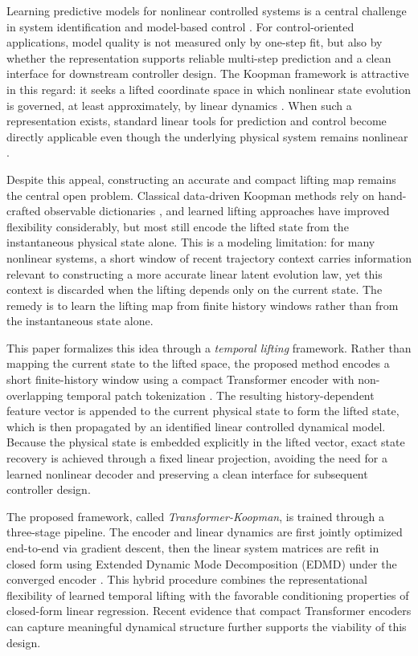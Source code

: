 \documentclass[journal]{IEEEtran}
\begin{document}
Learning predictive models for nonlinear controlled systems is a central challenge in system identification and model-based control \cite{ljung1999system, vanoverschee1994n4sid, nelles2020nonlinear}. For control-oriented applications, model quality is not measured only by one-step fit, but also by whether the representation supports reliable multi-step prediction and a clean interface for downstream controller design. The Koopman framework is attractive in this regard: it seeks a lifted coordinate space in which nonlinear state evolution is governed, at least approximately, by linear dynamics \cite{koopman1931hamiltonian, brunton2022modern}. When such a representation exists, standard linear tools for prediction and control become directly applicable even though the underlying physical system remains nonlinear \cite{otto2021koopman, korda2018linear}.

Despite this appeal, constructing an accurate and compact lifting map remains the central open problem. Classical data-driven Koopman methods rely on hand-crafted observable dictionaries \cite{williams2015data, klus2018data}, and learned lifting approaches \cite{lusch2018deep, takeishi2017koopman} have improved flexibility considerably, but most still encode the lifted state from the instantaneous physical state alone. This is a modeling limitation: for many nonlinear systems, a short window of recent trajectory context carries information relevant to constructing a more accurate linear latent evolution law, yet this context is discarded when the lifting depends only on the current state. The remedy is to learn the lifting map from finite history windows rather than from the instantaneous state alone.

This paper formalizes this idea through a \emph{temporal lifting} framework. Rather than mapping the current state to the lifted space, the proposed method encodes a short finite-history window using a compact Transformer encoder \cite{vaswani2017attention} with non-overlapping temporal patch tokenization \cite{nie2023time}. The resulting history-dependent feature vector is appended to the current physical state to form the lifted state, which is then propagated by an identified linear controlled dynamical model. Because the physical state is embedded explicitly in the lifted vector, exact state recovery is achieved through a fixed linear projection, avoiding the need for a learned nonlinear decoder and preserving a clean interface for subsequent controller design.

The proposed framework, called \emph{Transformer-Koopman}, is trained through a three-stage pipeline. The encoder and linear dynamics are first jointly optimized end-to-end via gradient descent, then the linear system matrices are refit in closed form using Extended Dynamic Mode Decomposition (EDMD) under the converged encoder \cite{williams2015data, proctor2018generalizing}. This hybrid procedure combines the representational flexibility of learned temporal lifting with the favorable conditioning properties of closed-form linear regression. Recent evidence that compact Transformer encoders can capture meaningful dynamical structure \cite{forootani2026compact, forootani2025synthetic} further supports the viability of this design.
\end{document}
